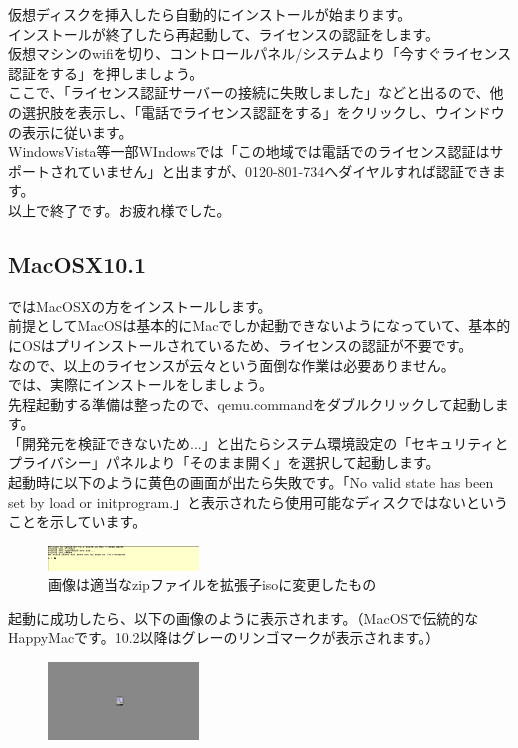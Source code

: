 \documentclass[b5paper,9pt,platex,dvipdfmx]{jsarticle}
\begin{document}
\begin{multicols*}{3}
仮想ディスクを挿入したら自動的にインストールが始まります。\\
インストールが終了したら再起動して、ライセンスの認証をします。\\
仮想マシンのwifiを切り、コントロールパネル/システムより「今すぐライセンス認証をする」を押しましょう。\\
ここで、「ライセンス認証サーバーの接続に失敗しました」などと出るので、他の選択肢を表示し、「電話でライセンス認証をする」をクリックし、ウインドウの表示に従います。\\
WindowsVista等一部WIndowsでは「この地域では電話でのライセンス認証はサポートされていません」と出ますが、0120-801-734へダイヤルすれば認証できます。\\
以上で終了です。お疲れ様でした。\\
\subsection{MacOSX10.1}
ではMacOSXの方をインストールします。\\
前提としてMacOSは基本的にMacでしか起動できないようになっていて、基本的にOSはプリインストールされているため、ライセンスの認証が不要です。\\
なので、以上のライセンスが云々という面倒な作業は必要ありません。\\
では、実際にインストールをしましょう。\\
先程起動する準備は整ったので、qemu.commandをダブルクリックして起動します。\\
「開発元を検証できないため...」と出たらシステム環境設定の「セキュリティとプライバシー」パネルより「そのまま開く」を選択して起動します。\\
起動時に以下のように黄色の画面が出たら失敗です。「No valid  state has been set by load or init\-program.」と表示されたら使用可能なディスクではないということを示しています。\\
\begin{figure}[H]
  \centering
  \includegraphics[width=4cm]{4.png}
  \caption{画像は適当なzipファイルを拡張子isoに変更したもの}
\end{figure}
起動に成功したら、以下の画像のように表示されます。（MacOSで伝統的なHappyMacです。10.2以降はグレーのリンゴマークが表示されます。）\\
\begin{figure}[H]
  \centering
  \includegraphics[width=4cm]{5.png}

\end{figure}
\end{multicols*}
\end{document}
